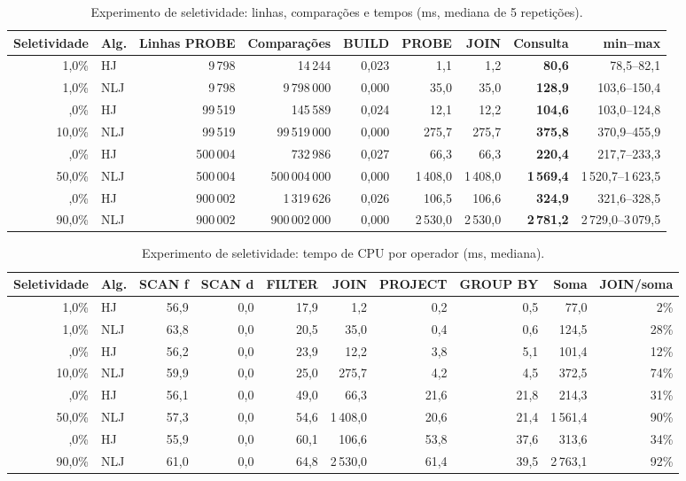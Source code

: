 \documentclass[11pt,a4paper]{article}
\begin{document}
\begin{table}[H]
\centering
\footnotesize
\setlength{\tabcolsep}{3.5pt}
\begin{tabular}{@{}rlrrrrrrr@{}}
\toprule
Seletividade & Alg. & Linhas PROBE & Comparações & BUILD & PROBE & JOIN & Consulta & min--max \\
\midrule
1,0\% & HJ & 9\,798 & 14\,244 & 0,023 & 1,1 & 1,2 & \textbf{80,6} & 78,5--82,1 \\
1,0\% & NLJ & 9\,798 & 9\,798\,000 & 0,000 & 35,0 & 35,0 & \textbf{128,9} & 103,6--150,4 \\
\addlinespace[2pt]
10,0\% & HJ & 99\,519 & 145\,589 & 0,024 & 12,1 & 12,2 & \textbf{104,6} & 103,0--124,8 \\
10,0\% & NLJ & 99\,519 & 99\,519\,000 & 0,000 & 275,7 & 275,7 & \textbf{375,8} & 370,9--455,9 \\
\addlinespace[2pt]
50,0\% & HJ & 500\,004 & 732\,986 & 0,027 & 66,3 & 66,3 & \textbf{220,4} & 217,7--233,3 \\
50,0\% & NLJ & 500\,004 & 500\,004\,000 & 0,000 & 1\,408,0 & 1\,408,0 & \textbf{1\,569,4} & 1\,520,7--1\,623,5 \\
\addlinespace[2pt]
90,0\% & HJ & 900\,002 & 1\,319\,626 & 0,026 & 106,5 & 106,6 & \textbf{324,9} & 321,6--328,5 \\
90,0\% & NLJ & 900\,002 & 900\,002\,000 & 0,000 & 2\,530,0 & 2\,530,0 & \textbf{2\,781,2} & 2\,729,0--3\,079,5 \\
\bottomrule
\end{tabular}
\caption{Experimento de seletividade: linhas, comparações e tempos (ms, mediana de 5 repetições).}
\label{tab:seletividade-tempo}
\end{table}
\begin{table}[H]
\centering
\footnotesize
\setlength{\tabcolsep}{3.5pt}
\begin{tabular}{@{}rlrrrrrrrr@{}}
\toprule
Seletividade & Alg. & SCAN f & SCAN d & FILTER & JOIN & PROJECT & GROUP BY & Soma & JOIN/soma \\
\midrule
1,0\% & HJ & 56,9 & 0,0 & 17,9 & 1,2 & 0,2 & 0,5 & 77,0 & 2\% \\
1,0\% & NLJ & 63,8 & 0,0 & 20,5 & 35,0 & 0,4 & 0,6 & 124,5 & 28\% \\
\addlinespace[2pt]
10,0\% & HJ & 56,2 & 0,0 & 23,9 & 12,2 & 3,8 & 5,1 & 101,4 & 12\% \\
10,0\% & NLJ & 59,9 & 0,0 & 25,0 & 275,7 & 4,2 & 4,5 & 372,5 & 74\% \\
\addlinespace[2pt]
50,0\% & HJ & 56,1 & 0,0 & 49,0 & 66,3 & 21,6 & 21,8 & 214,3 & 31\% \\
50,0\% & NLJ & 57,3 & 0,0 & 54,6 & 1\,408,0 & 20,6 & 21,4 & 1\,561,4 & 90\% \\
\addlinespace[2pt]
90,0\% & HJ & 55,9 & 0,0 & 60,1 & 106,6 & 53,8 & 37,6 & 313,6 & 34\% \\
90,0\% & NLJ & 61,0 & 0,0 & 64,8 & 2\,530,0 & 61,4 & 39,5 & 2\,763,1 & 92\% \\
\bottomrule
\end{tabular}
\caption{Experimento de seletividade: tempo de CPU por operador (ms, mediana).}
\label{tab:seletividade-ops}
\end{table}
\end{document}
